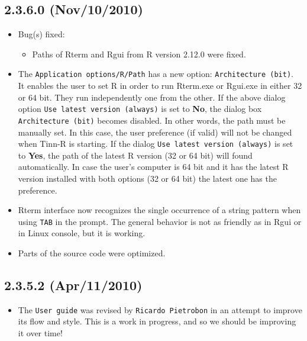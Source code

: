 \subsection*{2.3.6.0 (Nov/10/2010)}
\begin{itemize}
  \item Bug(s) fixed:
    \begin{itemize}
      \item Paths of Rterm and Rgui from R version 2.12.0 were fixed.
    \end{itemize}
  \item The \texttt{Application options/R/Path} has a new option: \texttt{Architecture (bit)}.
    It enables the user to set R in order to run Rterm.exe or Rgui.exe in either 32 or 64 bit.
    They run independently one from the other. If the above dialog option \texttt{Use latest version (always)} is set 
    to \textbf{No}, the dialog box \texttt{Architecture (bit)} becomes disabled.
    In other words, the path must be manually set. In this case, the user preference (if valid) will not be changed when Tinn-R is starting.
    If the dialog \texttt{Use latest version (always)} is set to \textbf{Yes}, the path of the latest R version (32 or 64 bit) will found automatically.
    In case the user's computer is 64 bit and it has the latest R version installed with both options (32 or 64 bit) the latest one has the preference.
  \item Rterm interface now recognizes the single occurrence of a string pattern when using \texttt{TAB} in the prompt.
    The general behavior is not as friendly as in Rgui or in Linux console, but it is working.
  \item Parts of the source code were optimized.
\end{itemize}


\subsection*{2.3.5.2 (Apr/11/2010)}
\begin{itemize}
  \item The \texttt{User guide} was revised by \texttt{Ricardo Pietrobon}
    in an attempt to improve its flow and style. This is a work in progress,
    and so we should be improving it over time!
\end{itemize}


